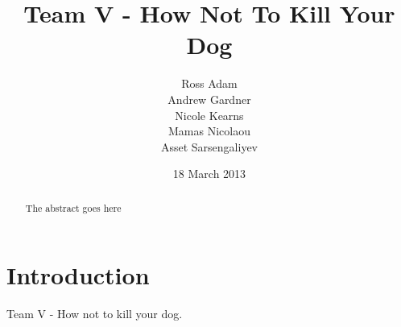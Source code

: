 \documentclass{l3proj}
\begin{document}
\title{Team V - How Not To Kill Your Dog}
\author{Ross Adam \\
        Andrew Gardner \\
        Nicole Kearns \\
        Mamas Nicolaou \\
        Asset Sarsengaliyev}
\date{18 March 2013}
\maketitle
\begin{abstract}

The abstract goes here

\end{abstract}
\educationalconsent
\tableofcontents

\chapter{Introduction}
\label{intro}

Team V - How not to kill your dog.
\end{document}
